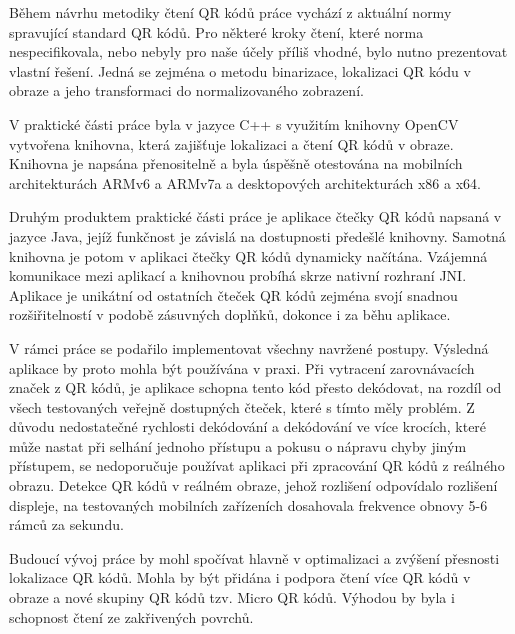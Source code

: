 Během návrhu metodiky čtení QR kódů práce vychází z aktuální normy
spravující standard QR kódů. Pro některé kroky čtení, které norma
nespecifikovala, nebo nebyly pro naše účely příliš vhodné, bylo nutno
prezentovat vlastní řešení. Jedná se zejména o metodu binarizace, lokalizaci QR
kódu v obraze a jeho transformaci do normalizovaného zobrazení.

V praktické části práce byla v jazyce C++ s využitím knihovny OpenCV vytvořena
knihovna, která zajišťuje lokalizaci a čtení QR kódů v obraze. Knihovna je
napsána přenositelně a byla úspěšně otestována na mobilních architekturách
ARMv6 a ARMv7a a desktopových architekturách x86 a x64.

Druhým produktem praktické části práce je aplikace čtečky QR kódů napsaná v
jazyce Java, jejíž funkčnost je závislá na dostupnosti předešlé knihovny.
Samotná knihovna je potom v aplikaci čtečky QR kódů dynamicky načítána. Vzájemná
komunikace mezi aplikací a knihovnou probíhá skrze nativní rozhraní JNI.
Aplikace je unikátní od ostatních čteček QR kódů zejména svojí snadnou
rozšiřitelností v podobě zásuvných doplňků, dokonce i za běhu aplikace.

V rámci práce se podařilo implementovat všechny navržené postupy. Výsledná
aplikace by proto mohla být používána v praxi. Při vytracení zarovnávacích
značek z QR kódů, je aplikace schopna tento kód přesto dekódovat, na rozdíl od
všech testovaných veřejně dostupných čteček, které s tímto měly problém. Z
důvodu nedostatečné rychlosti dekódování a dekódování ve více krocích, které
může nastat při selhání jednoho přístupu a pokusu o nápravu chyby jiným
přístupem, se nedoporučuje používat aplikaci při zpracování QR kódů z reálného
obrazu. Detekce QR kódů v  reálném obraze, jehož rozlišení
odpovídalo rozlišení displeje, na testovaných mobilních zařízeních dosahovala
frekvence obnovy 5-6 rámců za sekundu.

Budoucí vývoj práce by mohl spočívat hlavně v optimalizaci a zvýšení přesnosti
lokalizace QR kódů. Mohla by být přidána i podpora čtení více QR kódů v obraze
a nové skupiny QR kódů tzv. Micro QR kódů. Výhodou by byla i schopnost čtení ze
zakřivených povrchů.

